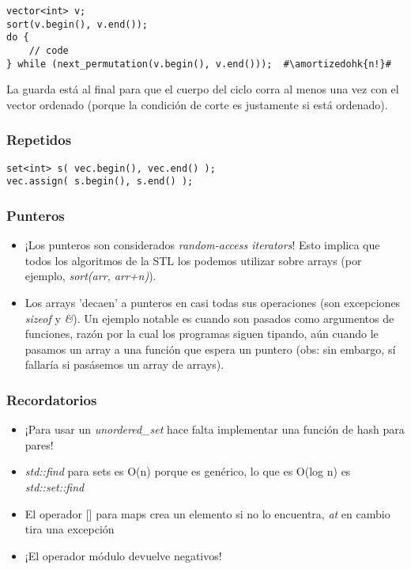 \begin{lstlisting}
vector<int> v;
sort(v.begin(), v.end());
do {
    // code
} while (next_permutation(v.begin(), v.end()));  #\amortizedohk{n!}#
\end{lstlisting}

La guarda está al final para que el cuerpo del ciclo corra al menos una vez con el vector ordenado (porque la condición de corte es justamente si está ordenado).

\subsubsection*{Repetidos}
\begin{lstlisting}
set<int> s( vec.begin(), vec.end() );
vec.assign( s.begin(), s.end() );
\end{lstlisting}

\subsubsection*{Punteros}

\begin{itemize}
    \item ¡Los punteros son considerados \textit{random-access iterators}! Esto implica que todos los algoritmos de la STL los podemos utilizar sobre arrays (por ejemplo, \textit{sort(arr, arr+n)}).
    \item Los arrays 'decaen' a punteros en casi todas sus operaciones (son excepciones \textit{sizeof} y \textit{\&}). Un ejemplo notable es cuando son pasados como argumentos de funciones, razón por la cual los programas siguen tipando, aún cuando le pasamos un array a una función que espera un puntero (obs: sin embargo, sí fallaría si pasásemos un array de arrays).
\end{itemize}

\subsubsection*{Recordatorios}

\begin{itemize}
    \item ¡Para usar un \textit{unordered\_set} hace falta implementar una función de hash para pares!
    \item \textit{std::find} para sets es O(n) porque es genérico, lo que es O(log n) es \textit{std::set::find}
    \item El operador [] para maps crea un elemento si no lo encuentra, \textit{at} en cambio tira una excepción
    \item ¡El operador módulo devuelve negativos!
\end{itemize}
